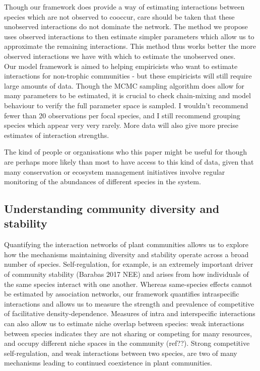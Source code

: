 \documentclass[a4,12pt]{article}
\begin{document}
        Though our framework does provide a way of estimating interactions between species which are not observed to cooccur, care should be taken that these unobserved interactions do not dominate the network. The method we propose uses observed interactions to then estimate simpler parameters which allow us to approximate the remaining interactions. This method thus works better the more observed interactions we have with which to estimate the unobserved ones. \\

        Our model framework is aimed to helping empiricists who want to estimate interactions for non-trophic communities - but these empiricists will still require large amounts of data. Though the MCMC sampling algorithm does allow for many parameters to be estimated, it is crucial to check chain-mixing and model behaviour to verify the full parameter space is sampled. I wouldn't recommend fewer than 20 observations per focal species, and I still recommend grouping species which appear very very rarely. More data will also give more precise estimates of interaction strengths. 

        The kind of people or organisations who this paper might be useful for though are perhaps more likely than most to have access to this kind of data, given that many conservation or ecosystem management initiatives involve regular monitoring of the abundances of different species in the system. 


    \subsection{Understanding community diversity and stability}

        Quantifying the interaction networks of plant communities allows us to explore how the mechanisms maintaining diversity and stability operate across a broad number of species. Self-regulation, for example, is an extremely important driver of community stability (Barabas 2017 NEE) and arises from how individuals of the same species interact with one another. Whereas same-species effects cannot be estimated by association networks, our framework quantifies intraspecific interactions and allows us to measure the strength and prevalence of competitive of facilitative density-dependence. Measures of intra and interspecific interactions can also allow us to estimate niche overlap between species: weak interactions between species indicates they are not sharing or competing for many resources, and occupy different niche spaces in the community (ref??). Strong competitive self-regulation, and weak interactions between two species, are two of many mechanisms leading to continued coexistence in plant communities.\\
\end{document}
